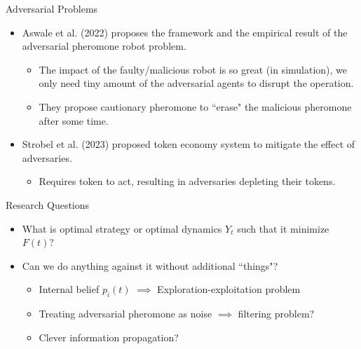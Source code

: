 \documentclass[10pt]{beamer}
\begin{document}
\begin{frame}{Adversarial Problems}
\begin{itemize}
    \item Aswale et al. (2022) proposes the framework and the empirical result of the adversarial pheromone robot problem. 
    \begin{itemize}
        \item The impact of the faulty/malicious robot is so great (in simulation), we only need tiny amount of the adversarial agents to disrupt the operation.
        \item They propose cautionary pheromone to ``erase" the malicious pheromone after some time.
    \end{itemize}
        \item Strobel et al. (2023) proposed token economy system to mitigate the effect of adversaries. 
    \begin{itemize}
        \item Requires token to act, resulting in adversaries depleting their tokens.
    \end{itemize}
\end{itemize}
    
\end{frame}

  \begin{frame}{Research Questions}
  \begin{itemize}
      \item What is optimal strategy or optimal dynamics $Y_t$ such that it minimize $F(t)$?
      \item Can we do anything against it without additional ``things"?
      \begin{itemize}
          \item Internal belief $p_i(t)$ $\implies$ Exploration-exploitation problem
          \item Treating adversarial pheromone as noise $\implies$ filtering problem?
          \item Clever information propagation?
      \end{itemize}
  \end{itemize}
  \end{frame}
\end{document}

